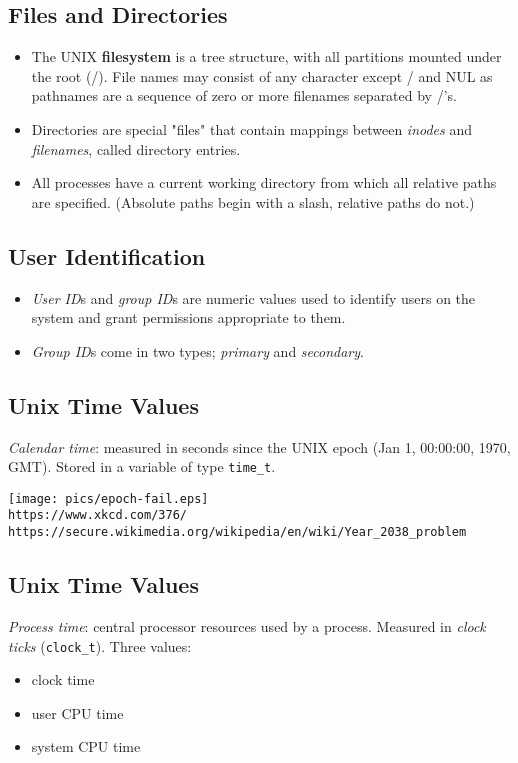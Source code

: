 \documentclass[xga]{xdvislides}
\begin{document}
\subsection{Files and Directories}
\begin{itemize}
	\item The UNIX {\bf filesystem} is a tree structure, with all partitions
		mounted under the root (/). File names may consist of any
		character except / and NUL as pathnames are a sequence of
		zero or more filenames separated by /'s.
	\item Directories are special "files" that contain mappings
		between {\em inodes} and {\em filenames}, called directory
		entries.
	\item All processes have a current working directory from which
		all relative paths are specified. (Absolute paths begin
		with a slash, relative paths do not.)
\end{itemize}

\subsection{User Identification}
\begin{itemize}
	\item {\em User ID}s and {\em group ID}s are numeric values used to
		identify users on the system and grant permissions appropriate to them.
	\item {\em Group ID}s come in two types; {\em primary} and {\em secondary}.
\end{itemize}

\subsection{Unix Time Values}
{\em Calendar time}: measured in seconds since the UNIX epoch (Jan
1, 00:00:00, 1970, GMT). Stored in a variable of type {\tt time\_t}.
\\

\begin{center}
\texttt{[image: pics/epoch-fail.eps]} \\
\verb+https://www.xkcd.com/376/+ \\
\vspace{.25in}
\verb+https://secure.wikimedia.org/wikipedia/en/wiki/Year_2038_problem+
\end{center}


\subsection{Unix Time Values}
{\em Process time}: central processor resources used by a process.
Measured in {\em clock ticks} ({\tt clock\_t}).  Three values:
\begin{itemize}
	\item clock time
	\item user CPU time
	\item system CPU time
\end{itemize}
\end{document}
